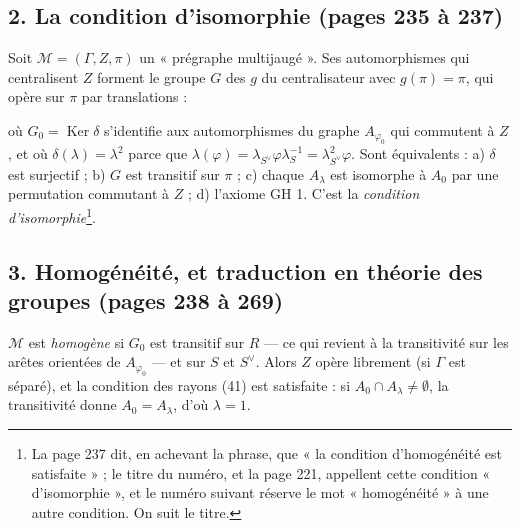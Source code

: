 \documentclass[11pt,a4paper]{article}
\begin{document}
\subsection*{2. La condition d'isomorphie (pages 235 à 237)}

Soit $\mathcal{M} = (\Gamma, Z, \pi)$ un « prégraphe multijaugé ». Ses
automorphismes qui centralisent $Z$ forment le groupe $G$ des $g$ du
centralisateur avec $g(\pi) = \pi$, qui opère sur $\pi$ par translations :
où $G_0 = \operatorname{Ker}\delta$ s'identifie aux automorphismes du graphe
$A_{\varphi_0}$ qui commutent à $Z$, et où $\delta(\lambda) = \lambda^2$ parce
que $\lambda(\varphi) = \lambda_{S^{\vee}}\varphi\lambda_S^{-1} =
\lambda_{S^{\vee}}^2\varphi$. Sont équivalents : a) $\delta$ est surjectif ; b)
$G$ est transitif sur $\pi$ ; c) chaque $A_\lambda$ est isomorphe à $A_0$ par
une permutation commutant à $Z$ ; d) l'axiome GH 1. C'est la \emph{condition
d'isomorphie}\footnote{La page 237 dit, en achevant la phrase, que « la condition
d'homogénéité est satisfaite » ; le titre du numéro, et la page 221, appellent
cette condition « d'isomorphie », et le numéro suivant réserve le mot
« homogénéité » à une autre condition. On suit le titre.}.

\subsection*{3. Homogénéité, et traduction en théorie des groupes (pages 238 à 269)}

$\mathcal{M}$ est \emph{homogène} si $G_0$ est transitif sur $R$ --- ce qui
revient à la transitivité sur les arêtes orientées de $A_{\varphi_0}$ --- et sur
$S$ et $S^{\vee}$. Alors $Z$ opère librement (si $\Gamma$ est séparé), et la
condition des rayons (41) est satisfaite : si $A_0 \cap A_\lambda \neq
\emptyset$, la transitivité donne $A_0 = A_\lambda$, d'où $\lambda = 1$.
\end{document}
